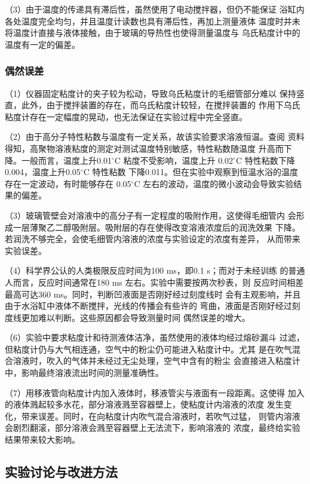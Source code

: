 \documentclass[12pt]{ctexart}
\numberwithin{equation}{section}
\begin{document}
（3）由于温度的传递具有滞后性，虽然使用了电动搅拌器，但仍不能保证
浴缸内各处温度完全均匀，并且温度计读数也具有滞后性，再加上测量液体
温度时并未将温度计直接与液体接触，由于玻璃的导热性也使得测量温度与
乌氏粘度计中的温度有一定的偏差。

\subsubsection{偶然误差}

（1）仪器固定粘度计的夹子较为松动，导致乌氏粘度计的毛细管部分难以
保持竖直，此外，由于搅拌装置的存在，而乌氏粘度计较轻，在搅拌装置的
作用下乌氏粘度计存在一定幅度的晃动，也无法保证在实验过程中完全竖直。

（2）由于高分子特性粘数与温度有一定关系，故该实验要求溶液恒温。查阅
资料得知，高聚物溶液粘度的测定对测试温度特别敏感，特性粘数随温度
升高而下降。一般而言，温度上升0.01$^\circ$C 粘度不受影响，温度上升
0.02$^\circ$C 特性粘数下降0.004，温度上升0.05$^\circ$C 特性粘数
下降0.011。但在实验中观察到恒温水浴的温度存在一定波动，有时能够存在
0.05$^\circ$C 左右的波动，温度的微小波动会导致实验结果的偏差。

（3）玻璃管壁会对溶液中的高分子有一定程度的吸附作用，这使得毛细管内
会形成一层薄聚乙二醇吸附层。吸附层的存在使得改变溶液浓度后的润洗效果
下降。若润洗不够完全，会使毛细管内溶液的浓度与实验设定的浓度有差异，
从而带来实验误差。

（4）科学界公认的人类极限反应时间为100 ms，即0.1 s；而对于未经训练
的普通人而言，反应时间通常在180 ms 左右。实验中需要按两次秒表，则
反应时间相差最高可达360 ms。同时，判断凹液面是否刚好经过刻度线时
会有主观影响，并且由于水浴缸中液体不断搅拌，光线的传播会有些许的
弯曲，液面是否刚好经过刻度线更加难以判断。这些原因都会导致测量时间
偶然误差的增大。

（6）实验中要求粘度计和待测液体洁净，虽然使用的液体均经过熔砂漏斗
过滤，但粘度计仍与大气相连通，空气中的粉尘仍可能进入粘度计中。尤其
是在吹气混合溶液时，吹入的气体并未经过无尘处理，空气中含有的粉尘
会直接进入粘度计中，影响最终溶液流出时间的测量准确性。

（7）用移液管向粘度计内加入液体时，移液管尖与液面有一段距离。这使得
加入的液体溅起较多水花，部分溶液溅至容器壁上，使粘度计内溶液的浓度
发生变化，带来误差。同时，在向粘度计内吹气混合溶液时，若吹气过猛，
则管内溶液会剧烈翻滚，部分溶液会溅至容器壁上无法流下，影响溶液的
浓度，最终给实验结果带来较大影响。

\subsection{实验讨论与改进方法}
\end{document}
